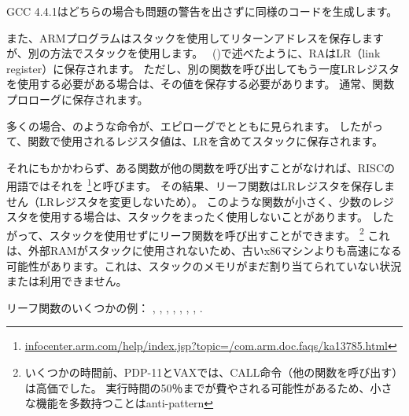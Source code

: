 GCC 4.4.1はどちらの場合も問題の警告を出さずに同様のコードを生成します。


また、ARMプログラムはスタックを使用してリターンアドレスを保存しますが、別の方法でスタックを使用します。 
\q{\HelloWorldSectionName}~()で述べたように、\ac{RA}は\ac{LR}（\gls{link register}）に保存されます。 
ただし、別の関数を呼び出してもう一度\ac{LR}レジスタを使用する必要がある場合は、その値を保存する必要があります。 
通常、関数プロローグに保存されます。

多くの場合、のような命令が、エピローグでとともに見られます。
したがって、関数で使用されるレジスタ値は、\ac{LR}を含めてスタックに保存されます。

それにもかかわらず、ある関数が他の関数を呼び出すことがなければ、\ac{RISC}の用語ではそれを
\footnote{\href{http://go.yurichev.com/17064}{infocenter.arm.com/help/index.jsp?topic=/com.arm.doc.faqs/ka13785.html}}と呼びます。
その結果、リーフ関数は\ac{LR}レジスタを保存しません（\ac{LR}レジスタを変更しないため）。 
このような関数が小さく、少数のレジスタを使用する場合は、スタックをまったく使用しないことがあります。 
したがって、スタックを使用せずにリーフ関数を呼び出すことができます。
\footnote{いくつかの時間前、PDP-11とVAXでは、CALL命令（他の関数を呼び出す）は高価でした。 
実行時間の50％までが費やされる可能性があるため、小さな機能を多数持つことは\gls{anti-pattern} }
これは、外部RAMがスタックに使用されないため、古いx86マシンよりも高速になる可能性があります。これは、スタックのメモリがまだ割り当てられていない状況 または利用できません。

リーフ関数のいくつかの例：
, , 
, , ,
, , .
